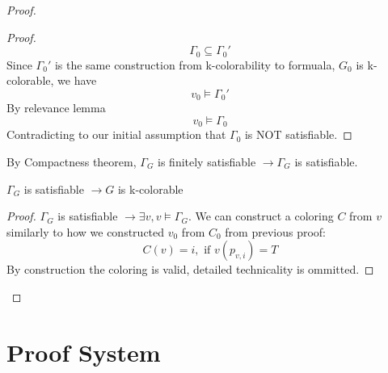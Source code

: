 \documentclass{article}
\newtheorem{lemma}[theorem]{Lemma}
\let\oldlemma\lemma
\let\endoldlemma\endlemma
\renewenvironment{lemma}
  {\begin{tcolorbox}[
      colback=green!8,
      colframe=green!50!black,
      boxrule=0.6pt,
      arc=2pt,
      left=6pt,right=6pt,top=4pt,bottom=4pt
    ]\oldlemma}
  {\endoldlemma\end{tcolorbox}}
\begin{document}
\begin{proof}
\begin{proof}
    \[\Gamma_0 \subseteq \Gamma_0'\] %
    Since $\Gamma_0'$ is the same construction from k-colorability to formuala, $G_0$ is k-colorable, we have 
    \[v_0 \models \Gamma_0'\]
    By relevance lemma
    \[v_0 \models \Gamma_0\]
    Contradicting to our initial assumption that $\Gamma_0$ is NOT satisfiable. 
    \end{proof}
By Compactness theorem, $\Gamma_G$ is finitely satisfiable $\rightarrow \Gamma_G$ is 
satisfiable.
    \begin{lemma}
        $\Gamma_G$ is satisfiable $\rightarrow G$ is k-colorable 
    \end{lemma}
    \begin{proof}
        $\Gamma_G$ is satisfiable $\rightarrow \exists v, v\models \Gamma_G$. We can construct a coloring $C$ from $v$ 
        similarly to how we constructed $v_0$ from $C_0$ from previous proof:
        \[C(v) = i, \text{ if } v(p_{v, i}) = T\]
        By construction the coloring is valid, detailed technicality is ommitted.
    \end{proof}
\end{proof}
\section{Proof System}
\end{document}
